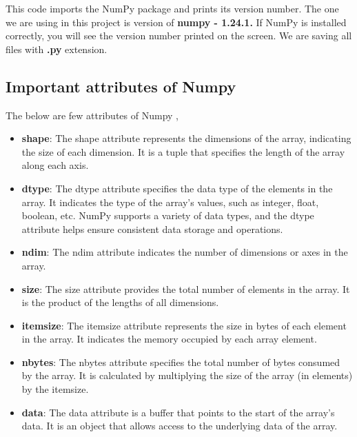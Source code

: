 		This code imports the NumPy package and prints its version number. The one we are using in this project is version of \textbf{numpy - 1.24.1.} If NumPy is installed correctly, you will see the version number printed on the screen. We are saving all files with \textbf{.py} extension.
	
	\subsection{Important attributes of Numpy}
	
		The below are few attributes of Numpy \cite{NumPy2008},
			
		\begin{itemize}
		
			\item \textbf{shape}:
			The shape attribute represents the dimensions of the array, indicating the size of each dimension. It is a tuple that specifies the length of the array along each axis. 
			
			\item \textbf{dtype}:
			The dtype attribute specifies the data type of the elements in the array. It indicates the type of the array's values, such as integer, float, boolean, etc. NumPy supports a variety of data types, and the dtype attribute helps ensure consistent data storage and operations.
			
			\item \textbf{ndim}:
			The ndim attribute indicates the number of dimensions or axes in the array. 
			
			\item \textbf{size}:
			The size attribute provides the total number of elements in the array. It is the product of the lengths of all dimensions. 
			
			\item \textbf{itemsize}:
			The itemsize attribute represents the size in bytes of each element in the array. It indicates the memory occupied by each array element.
			
			\item \textbf{nbytes}:
			The nbytes attribute specifies the total number of bytes consumed by the array. It is calculated by multiplying the size of the array (in elements) by the itemsize.
			
			\item \textbf{data}:
			The data attribute is a buffer that points to the start of the array's data. It is an object that allows access to the underlying data of the array.
			
		\end{itemize}
	
